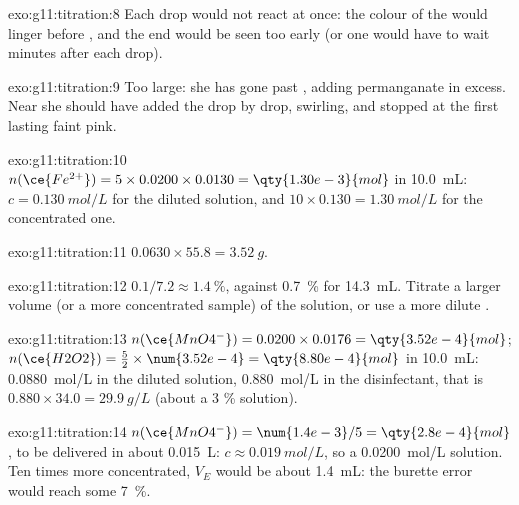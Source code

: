 \begin{solution}{exo:g11:titration:8}
Each drop would not react at once: the colour of the  would
linger before , and the end would be seen too early (or one
would have to wait minutes after each drop).
\end{solution}

\begin{solution}{exo:g11:titration:9}
Too large: she has gone past , adding permanganate in excess.
Near  she should have added the  drop by drop,
swirling, and stopped at the first lasting faint pink.
\end{solution}

\begin{solution}{exo:g11:titration:10}
$n(\ce{Fe^{2+}}) = 5 \times 0.0200 \times 0.0130 = \qty{1.30e-3}{mol}$ in
\qty{10.0}{mL}: $c = \qty{0.130}{mol/L}$ for the diluted solution, and
$10 \times 0.130 = \qty{1.30}{mol/L}$ for the concentrated one.
\end{solution}

\begin{solution}{exo:g11:titration:11}
$0.0630 \times 55.8 = \qty{3.52}{g}$.
\end{solution}

\begin{solution}{exo:g11:titration:12}
$0.1 / 7.2 \approx \qty{1.4}{\percent}$, against
\qty{0.7}{\percent} for \qty{14.3}{mL}. Titrate a larger volume (or a
more concentrated sample) of the solution, or use a more dilute .
\end{solution}

\begin{solution}{exo:g11:titration:13}
$n(\ce{MnO4^-}) = 0.0200 \times 0.0176 = \qty{3.52e-4}{mol}$;
$n(\ce{H2O2}) = \frac{5}{2} \times \num{3.52e-4} = \qty{8.80e-4}{mol}$ in
\qty{10.0}{mL}: \qty{0.0880}{mol/L} in the diluted solution,
\qty{0.880}{mol/L} in the disinfectant, that is
$0.880 \times 34.0 = \qty{29.9}{g/L}$ (about a 3 \% solution).
\end{solution}

\begin{solution}{exo:g11:titration:14}
$n(\ce{MnO4^-}) = \num{1.4e-3} / 5 = \qty{2.8e-4}{mol}$, to be delivered
in about \qty{0.015}{L}: $c \approx \qty{0.019}{mol/L}$, so a
\qty{0.0200}{mol/L} solution. Ten times more concentrated, $V_E$ would be
about \qty{1.4}{mL}: the burette error would reach some
\qty{7}{\percent}.
\end{solution}

